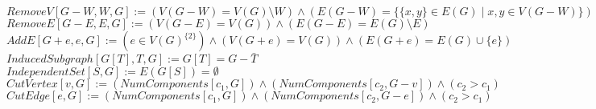 \documentclass{book}
\newcommand{\abr}{:=}
\newcommand{\st}{\mathbin{|}}
\newcommand{\utup}[1]{\{#1\}}
\begin{document}
$RemoveV[G - W, W, G] \abr (V(G - W) = V(G) \setminus W) \land (E(G - W) = \{\utup{x, y} \in E(G) \st x, y \in V(G - W)\})$ \\
$RemoveE[G - E, E, G] \abr (V(G - E) = V(G)) \land (E(G - E) = E(G) \setminus E)$ \\
$AddE[G + e, e, G] \abr (e \in V(G)^{\{2\}}) \land (V(G + e) = V(G)) \land (E(G + e) = E(G) \cup \{e\})$ \\
$InducedSubgraph[G[T], T, G] \abr G[T] = G - \bar{T}$ \\
$IndependentSet[S, G] \abr E(G[S]) = \emptyset $ \\

$CutVertex[v, G] \abr (NumComponents[c_1, G]) \land (NumComponents[c_2, G - v]) \land (c_2 > c_1)$ \\
$CutEdge[e, G] \abr (NumComponents[c_1, G]) \land (NumComponents[c_2, G - e]) \land (c_2 > c_1)$ \\
\end{document}
